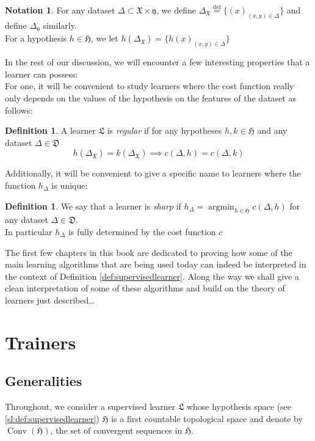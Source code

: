 \documentclass{book}
\theoremstyle{plain}
\theoremstyle{definition}
\newtheorem{definition}[corollary]{Definition}
\newtheorem{notation}{Notation}
\DeclareMathOperator{\argmin}{argmin}
\DeclareMathOperator{\Conv}{Conv}
\newcommand{\define}{\stackrel{\operatorname{def}}{=}}
\newcommand{\f}[1]{\mathfrak{#1}}
\begin{document}
\begin{notation}\label{not:Delta}
	For any dataset $\Delta \subset \f{X}\times \f{y}$, we define $\Delta_\f{X}\define\big\{(x)_{(x,y)\in \Delta}\big\}$ and define $\Delta_\f{y}$ similarly.\\
	For a hypothesis $h\in \f{H}$, we let $h(\Delta_\f{X})= \big\{h(x)_{(x,y)\in \Delta}\big\}$
\end{notation}

In the rest of our discussion, we will encounter a few interesting properties that a learner can possess:\\ 
\noindent For one, it will be convenient to study learners where the cost function really only depends on the values of the hypothesis on the features of the dataset as follows:


\begin{definition}\label{def:regularlearner}
	A learner $\f{L}$ is \emph{regular} if for any hypotheses $h,k \in \f{H}$ and any dataset $\Delta \in \f{D}$
	\[
	h(\Delta_\f{X})= k(\Delta_\f{X})\implies c(\Delta,h)=c(\Delta,k)
	\]
\end{definition}

Additionally, it will be convenient to give a specific name to learners where the function $h_\Delta$ is unique:
\begin{definition}\label{def:sharp}
We say that a learner is \emph{sharp} if $h_\Delta=\argmin_{h\in \f{H}} c(\Delta,h)$ for any dataset $\Delta \in \f{D}$.\\
 In particular $h_\Delta$ is fully determined by the cost function $c$
\end{definition}



\noindent The first few chapters in this book are dedicated to proving how some of the main learning algorithms that are being used today can indeed be interpreted in the context of Definition \ref{def:supervisedlearner}. Along the way we shall give a clean interpretation of some of these algorithms and build on the theory of learners just described\ldots
\section{Trainers}
\subsection{Generalities}

Throughout, we consider a supervised learner $\f{L}$ whose hypothesis space (see \ref{sl:def:supervisedlearner}) $\f{H}$ is a first countable topological space and denote by $\Conv(\f{H})$, the set of convergent sequences in $\f{H}$.\\
\end{document}
